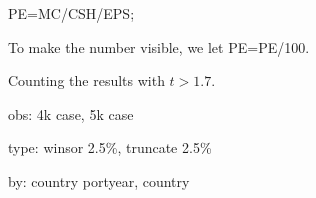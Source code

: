 

\usepackage[T1]{fontenc}




\thispagestyle{fancy}

\newcommand{\code}{\texttt}
\newcommand*{\Commonpath}{20190401}

PE=MC/CSH/EPS;

To make the number visible, we let PE=PE/100.

Counting the results with $t>1.7$.

obs: 4k case, 5k case

type: winsor 2.5\%, truncate 2.5\%

by: country portyear, country






